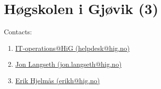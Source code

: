 \section{Høgskolen i Gjøvik (3)}
\label{sec:HiG}

Contacts:\begin{enumerate}
 \item {}\href{mailto:helpdesk@hig.no}{IT-operations@HiG (helpdesk@hig.no)}
 \item {}\href{mailto:jon.langseth@hig.no}{Jon Langseth (jon.langseth@hig.no)}
 \item {}\href{mailto:erikh@hig.no}{Erik Hjelmås (erikh@hig.no)}
\end{enumerate}

